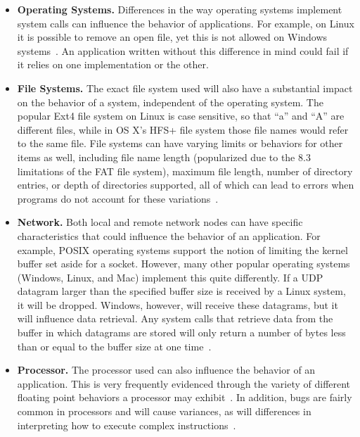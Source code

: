 \begin{itemize}

\item {\bf Operating Systems.} Differences in the way operating systems
implement system calls can influence the behavior of applications.  For
example, on Linux it is possible to remove an open file, yet this is not
allowed on Windows systems~\cite{UnlinkStandard}.  An application
written without this difference in mind could fail if it relies on one
implementation or the other.

\item {\bf File Systems.}  The exact file system used will also have a
substantial impact on the behavior of a system, independent of the
operating system.  The popular Ext4 file system on Linux is case sensitive,
so that ``a'' and ``A'' are different files,
while in OS X's HFS+ file system
those file names would refer to the same file.
File systems can have varying limits or behaviors for other items as well,
including file name length (popularized due to the 8.3 limitations of the
FAT file system), maximum file length, number of directory entries, or
depth
of directories supported, all of which can lead to errors when programs
do not account for these variations~\cite{EXT4Layout, AppleHFS}.

\item {\bf Network.} Both local and remote network nodes
can have specific characteristics that could influence the behavior of an
application.
For example, POSIX operating
systems support the notion of limiting the kernel buffer set aside for a
socket.  However, many other popular operating
systems (Windows, Linux, and Mac)
implement this quite differently.
If a UDP datagram
larger than the specified buffer size is received by a Linux system,
it will be dropped.
Windows,
however,
will receive these datagrams,
but it will influence data retrieval.
Any system calls that retrieve data from the buffer in which
datagrams are
stored will only return a number of bytes less than or equal to the
buffer size at one time~\cite{Zhuang_NSDI_2014}.

\item {\bf Processor.}  The processor used can also influence the
behavior of an application.  This is very frequently
evidenced through the variety of different floating point behaviors a
processor may exhibit~\cite{ArbitraryPrecision}.
In addition, bugs are fairly common
in processors and will cause variances, as will
differences in interpreting
how to execute complex instructions~\cite{Microarch}.

\end{itemize}

